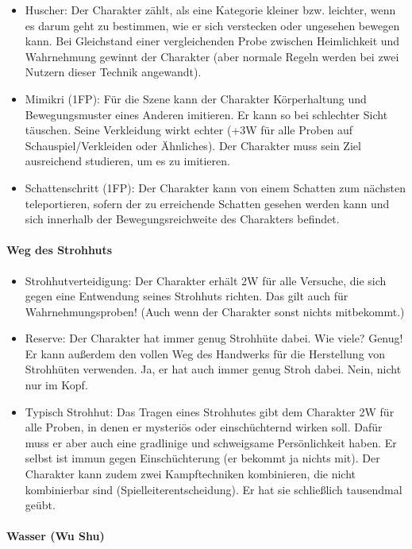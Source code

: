 \documentclass{article}
\begin{document}
\begin{itemize}
\item Huscher: Der Charakter zählt, als eine Kategorie kleiner bzw. leichter, wenn es darum geht zu bestimmen, wie er sich verstecken oder ungesehen bewegen kann. Bei Gleichstand einer vergleichenden Probe zwischen Heimlichkeit und Wahrnehmung gewinnt der Charakter (aber normale Regeln werden bei zwei Nutzern dieser Technik angewandt).
\item Mimikri (1FP): Für die Szene kann der Charakter Körperhaltung und Bewegungsmuster eines Anderen imitieren. Er kann so bei schlechter Sicht täuschen. Seine Verkleidung wirkt echter (+3W für alle Proben auf Schauspiel/Verkleiden oder Ähnliches). Der Charakter muss sein Ziel ausreichend studieren, um es zu imitieren.
\item Schattenschritt (1FP): Der Charakter kann von einem Schatten zum nächsten teleportieren, sofern der zu erreichende Schatten gesehen werden kann und sich innerhalb der Bewegungsreichweite des Charakters befindet.
\end{itemize}

\paragraph{Weg des Strohhuts}

\begin{itemize}
\item Strohhutverteidigung: Der Charakter erhält 2W für alle Versuche, die sich gegen eine Entwendung seines Strohhuts richten. Das gilt auch für Wahrnehmungsproben! (Auch wenn der Charakter sonst nichts mitbekommt.)
\item Reserve: Der Charakter hat immer genug Strohhüte dabei. Wie viele? Genug! Er kann außerdem den vollen Weg des Handwerks für die Herstellung von Strohhüten verwenden. Ja, er hat auch immer genug Stroh dabei. Nein, nicht nur im Kopf.
\item Typisch Strohhut: Das Tragen eines Strohhutes gibt dem Charakter 2W für alle Proben, in denen er mysteriös oder einschüchternd wirken soll. Dafür muss er aber auch eine gradlinige und schweigsame Persönlichkeit haben. Er selbst ist immun gegen Einschüchterung (er bekommt ja nichts mit). Der Charakter kann zudem zwei Kampftechniken kombinieren, die nicht kombinierbar sind (Spielleiterentscheidung). Er hat sie schließlich tausendmal geübt.
\end{itemize}

\paragraph{Wasser (Wu Shu)}
\end{document}
